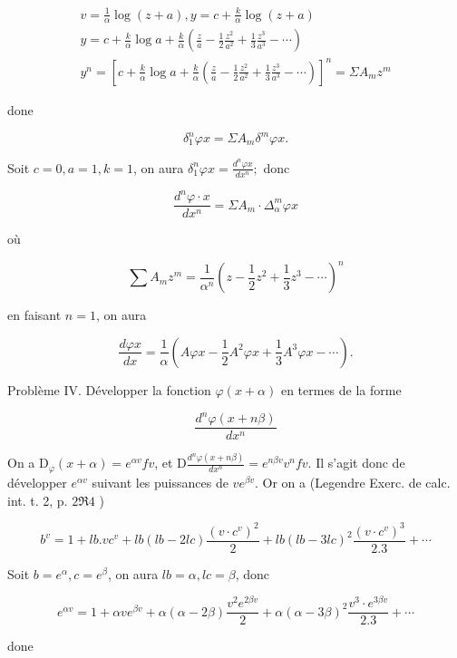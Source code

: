 \documentclass{article}
\begin{document}
\[
\begin{gathered}
v=\frac{1}{\alpha} \log (z+a), y=c+\frac{k}{\alpha} \log (z+a) \\
y=c+\frac{k}{\alpha} \log a+\frac{k}{\alpha}\left(\frac{z}{a}-\frac{1}{2} \frac{z^{2}}{a^{2}}+\frac{1}{3} \frac{z^{3}}{a^{3}}-\cdots\right) \\
y^{n}=\left[c+\frac{k}{\alpha} \log a+\frac{k}{\alpha}\left(\frac{z}{a}-\frac{1}{2} \frac{z^{2}}{a^{2}}+\frac{1}{3} \frac{z^{3}}{a^{3}}-\cdots\right)\right]^{n}=\Sigma A_{m} z^{m}
\end{gathered}
\]

done

\[
\delta_{1}^{n} \varphi x=\Sigma A_{m} \delta^{m} \varphi x .
\]

Soit \(c=0, a=1, k=1\), on aura \(\delta_{1}^{n} \varphi x=\frac{d^{n} \varphi x}{d x^{n}} ;\) donc

\[
\frac{d^{n} \varphi \cdot x}{d x^{n}}=\Sigma A_{m} \cdot \Delta_{\alpha}^{m} \varphi x
\]

où

\[
\sum A_{m} z^{m}=\frac{1}{\alpha^{n}}\left(z-\frac{1}{2} z^{2}+\frac{1}{3} z^{3}-\cdots\right)^{n}
\]

en faisant \(n=1\), on aura

\[
\frac{d \varphi x}{d x}=\frac{1}{\alpha}\left(A \varphi x-\frac{1}{2} A^{2} \varphi x+\frac{1}{3} A^{3} \varphi x-\cdots\right) .
\]

Problème IV. Développer la fonction \(\varphi(x+\alpha)\) en termes de la forme

\[
\frac{d^{n} \varphi(x+n \beta)}{d x^{n}}
\]

On a \(\mathrm{D}_{\varphi}(x+\alpha)=e^{\alpha v} f v\), et \(\mathrm{D} \frac{d^{n} \varphi(x+n \beta)}{d x^{n}}=e^{n \beta v} v^{n} f v\). Il s'agit donc de développer \(e^{\alpha v}\) suivant les puissances de \(v e^{\beta v}\). Or on a (Legendre Exerc. de calc. int. t. 2, p. \(2 \Re 4\) )

\[
b^{v}=1+l b . v c^{v}+l b(l b-2 l c) \frac{\left(v \cdot c^{v}\right)^{2}}{2}+l b(l b-3 l c)^{2} \frac{\left(v \cdot c^{v}\right)^{3}}{2.3}+\cdots
\]

Soit \(b=e^{\alpha}, c=e^{\beta}\), on aura \(l b=\alpha, l c=\beta\), donc

\[
e^{\alpha v}=1+\alpha v e^{\beta v}+\alpha(\alpha-2 \beta) \frac{v^{2} e^{2 \beta v}}{2}+\alpha(\alpha-3 \beta)^{2} \frac{v^{3} \cdot e^{3 \beta v}}{2.3}+\cdots
\]

done
\end{document}
